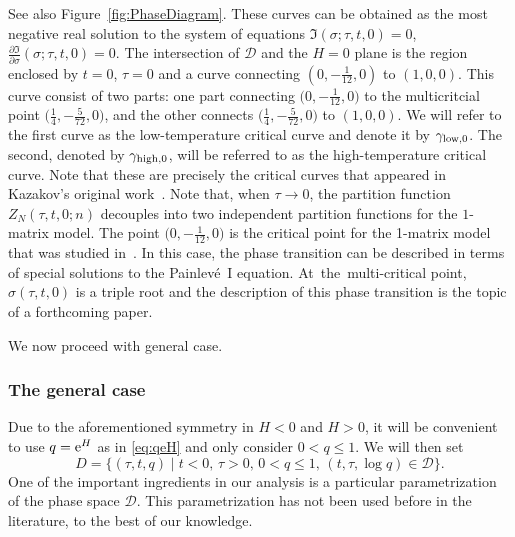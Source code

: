 \documentclass[10pt,a4paper]{amsart}
\numberwithin{equation}{section}
\begin{document}
 See also Figure~\ref{fig:PhaseDiagram}. These curves can be obtained as the most negative real solution to the system of equations $\mathfrak{I}(\sigma;\tau,t,0) = 0$, $\frac{\partial \mathfrak{I}}{\partial \sigma}(\sigma;\tau,t,0) = 0$. The intersection of $\mathcal D$ and the $H=0$ plane is the region enclosed by $t=0$, $\tau=0$ and a curve connecting $(0,-\frac{1}{12},0)$ to $(1,0,0)$. This curve consist of two parts: one part connecting $\bigl(0,-\frac{1}{12},0\bigr)$ to the multicritcial point $\bigl(\frac{1}{4},-\frac{5}{72},0\bigr)$, and the other connects $\bigl(\frac{1}{4},-\frac{5}{72},0\bigr)$ to $(1,0,0)$. We will refer to the first curve as the low-temperature critical curve and denote it by $\gamma_{{\rm low},0}$. The second, denoted by $\gamma_{{\rm high},0}$, will be referred to as the high-temperature critical curve. Note that these are precisely the critical curves that appeared in Kazakov's original work~\cite{Kazakov1}. Note that, when $\tau\to 0$, the partition function $Z_N(\tau,t,0;n)$ decouples into two independent partition functions for the $1$-matrix model. The point $\bigl(0,-\frac{1}{12},0\bigr)$ is the critical point for the 1-matrix model that was studied in~\cite{DK0, FIK1,FIK2}. In this case, the phase transition can be described in terms of special solutions to the Painlev\'e~I equation. At~the~multi-critical point, $\sigma(\tau,t,0)$ is a triple root and the description of this phase transition is the topic of a forthcoming paper.

 We now proceed with general case.
 \subsubsection{The general case}

 Due to the aforementioned symmetry in $H<0$ and $H>0$, it will be convenient to use $q={\rm e}^{H}$ as in \eqref{eq:qeH} and only consider $0< q \leq 1$. We will then set
\[
 D=\{(\tau,t,q) \mid t<0, \, \tau>0,\, 0<q \leq 1, \, (t,\tau,\log q) \in \mathcal{D}\}.
 \]
One of the important ingredients in our analysis is a particular parametrization of the phase space $\mathcal D$. This parametrization has not been used before in the literature, to the best of our knowledge.
\end{document}
